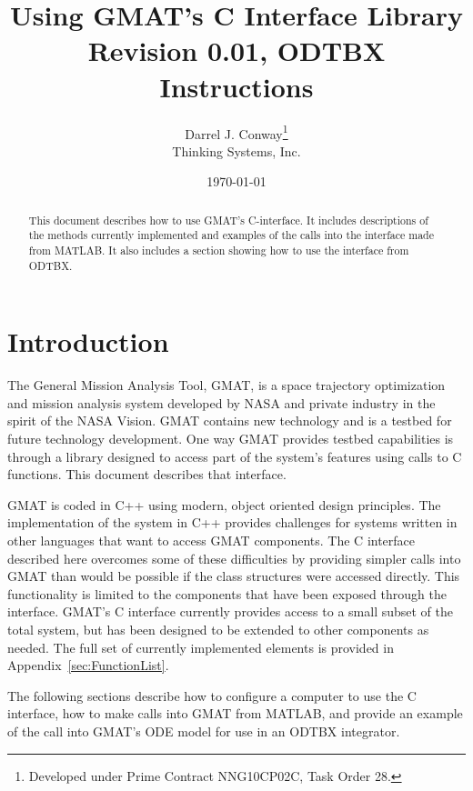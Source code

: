 \documentclass[letterpaper,10pt]{article}
\begin{document}
\title{Using GMAT's C Interface Library\\\large{Revision 0.01, ODTBX Instructions}}
\author{Darrel J. Conway\thanks{Developed under Prime Contract NNG10CP02C, Task Order 28.}
\\Thinking Systems, Inc.}
\date{\today}
\maketitle

\begin{abstract}
This document describes how to use GMAT's C-interface.  It includes descriptions of the methods currently implemented and examples of the calls into the interface made from MATLAB.  It also includes a section showing how to use the interface from ODTBX. 
\end{abstract}

\section{Introduction}

The General Mission Analysis Tool, GMAT, is a space trajectory optimization and mission analysis system developed by NASA and private industry in the spirit of the NASA Vision. GMAT contains new technology and is a testbed for future technology development. One way GMAT provides testbed capabilities is through a library designed to access part of the system's features using calls to C functions.  This document describes that interface.

GMAT is coded in C++ using modern, object oriented design principles.  The implementation of the system in C++ provides challenges for systems written in other languages that want to access GMAT components.  The C interface described here overcomes some of these difficulties by providing simpler calls into GMAT than would be possible if the class structures were accessed directly.  This functionality is limited to the components that have been exposed through the interface.  GMAT's C interface currently provides access to a small subset of the total system, but has been designed to be extended to other components as needed.  The full set of currently implemented elements is provided in Appendix~\ref{sec:FunctionList}.

The following sections describe how to configure a computer to use the C interface, how to make calls into GMAT from MATLAB, and provide an example of the call into GMAT's ODE model for use in an ODTBX integrator.
\end{document}
